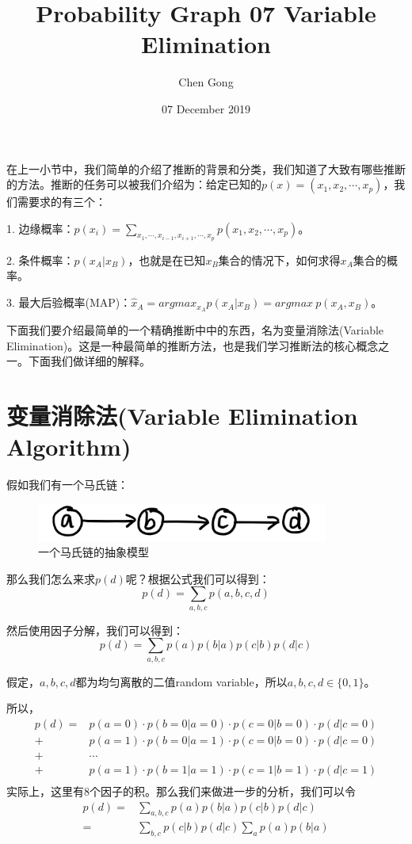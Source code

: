 \documentclass[a4paper]{article}
\title{Probability Graph 07 Variable Elimination}
\author{Chen Gong}
\date{07 December 2019}
\begin{document}
\maketitle
在上一小节中，我们简单的介绍了推断的背景和分类，我们知道了大致有哪些推断的方法。推断的任务可以被我们介绍为：给定已知的$p(x) = (x_1,x_2,\cdots,x_p)$，我们需要求的有三个：

1. 边缘概率：$p(x_i) = \sum_{x_1,\cdots,x_{i-1},x_{i+1},\cdots,x_p}p(x_1,x_2,\cdots,x_p)$。

2. 条件概率：$p(x_A|x_B)$，也就是在已知$x_B$集合的情况下，如何求得$x_A$集合的概率。

3. 最大后验概率(MAP)：$\hat{x}_A=argmax_{x_A}p(x_A|x_B) = argmax\ p(x_A,x_B)$。

下面我们要介绍最简单的一个精确推断中中的东西，名为变量消除法(Variable Elimination)。这是一种最简单的推断方法，也是我们学习推断法的核心概念之一。下面我们做详细的解释。

\section{变量消除法(Variable Elimination Algorithm)}
假如我们有一个马氏链：
\begin{figure}[H]
    \centering
    \includegraphics[width=.45\textwidth]{微信图片_20191207173240.png}
    \caption{一个马氏链的抽象模型}
    \label{fig:my_label_1}
\end{figure}

那么我们怎么来求$p(d)$呢？根据公式我们可以得到：
\begin{equation}
    p(d) = \sum_{a,b,c}p(a,b,c,d)
\end{equation}

然后使用因子分解，我们可以得到：
\begin{equation}
    p(d) = \sum_{a,b,c}p(a)p(b|a)p(c|b)p(d|c)
\end{equation}

假定，$a,b,c,d$都为均匀离散的二值random variable，所以$a,b,c,d\in \{0,1\}$。

所以，
\begin{equation}
    \begin{split}
        p(d) = & p(a=0)\cdot p(b=0|a=0) \cdot p(c=0|b=0) \cdot p(d|c=0) \\
        + & p(a=1)\cdot p(b=0|a=1) \cdot p(c=0|b=0) \cdot p(d|c=0) \\
        + & \cdots \\
        + & p(a=1)\cdot p(b=1|a=1) \cdot p(c=1|b=1) \cdot p(d|c=1) \\
    \end{split}
\end{equation}
实际上，这里有8个因子的积。那么我们来做进一步的分析，我们可以令
\begin{equation}
    \begin{split}
        p(d) 
        = & \sum_{a,b,c}p(a)p(b|a)p(c|b)p(d|c) \\
        = & \sum_{b,c}p(c|b)p(d|c)\sum_a p(a)p(b|a)
    \end{split}
\end{equation}
\end{document}

